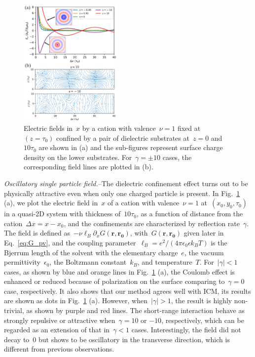 \documentclass[aps,prl,reprint,showpacs,floatfix,superscriptaddress]{revtex4-2}
\newcommand{\V}[1]{\boldsymbol{#1}} %
\newcommand{\D}[1]{\Delta#1} %
\newcommand{\abs}[1]{\left|#1\right|} %
\newcommand{\eps}{\epsilon}
\begin{document}
\begin{figure}[htbp]
	\centering
	\includegraphics[width=0.45\textwidth]{figs/fig2.pdf}
	\caption{
        Electric fields in~$x$ by a cation with valence~$\nu = 1$ fixed at~$(z = \tau_0)$ confined by a pair of dielectric substrates at~$z = 0$ and~$10 \tau_0$ are shown in (a) and the sub-figures represent surface charge density on the lower substrates.
        For~$\gamma = \pm 10$ cases, the corresponding field lines are plotted in (b).
		\label{fig:force_x}
            }
\end{figure}

\textit{Oscillatory single particle field.}--The dielectric confinement effect turns out to be physically attractive even when only one charged particle is present. 
In Fig.~\ref{fig:force_x} (a), we plot the electric field in~$x$ of a cation with valence~$\nu = 1$ at~$(x_0, y_0, \tau_0)$ in a quasi-2D system with thickness of~$10 \tau_0$, as a function of distance from the cation~$\D x = x - x_0$, and the confinements are characterized by reflection rate~$\gamma$.
The field is defined as~$ - \nu \ell_B \partial_x G(\V r, \V{r_0})$, with~$G(\V r, \V{r_0})$ given later in Eq.~\eqref{eq:G_pv}, and the coupling parameter~$\ell_B = e^2 / (4 \pi \eps_0 \eps k_B T)$ is the Bjerrum length of the solvent with the elementary charge~$e$, the vacuum permittivity~$\eps_0$, the Boltzmann constant~$k_B$, and temperature~$T$.
For~$\abs{\gamma} < 1$ cases, as shown by blue and orange lines in Fig.~\ref{fig:force_x} (a), the Coulomb effect is enhanced or reduced because of polarization on the surface comparing to~$\gamma = 0$ case, respectively.
It also shows that our method agrees well with ICM, its results are shown as dots in Fig.~\ref{fig:force_x} (a).
However, when~$\abs{\gamma} > 1$, the result is highly non-trivial, as shown by purple and red lines.
The short-range interaction behave as strongly repulsive or attractive when~$\gamma = 10$ or $-10$, respectively, which can be regarded as an extension of that in~$\gamma < 1$ cases.
Interestingly, the field did not decay to~$0$ but shows to be oscillatory in the transverse direction, which is different from previous observations.
\end{document}
